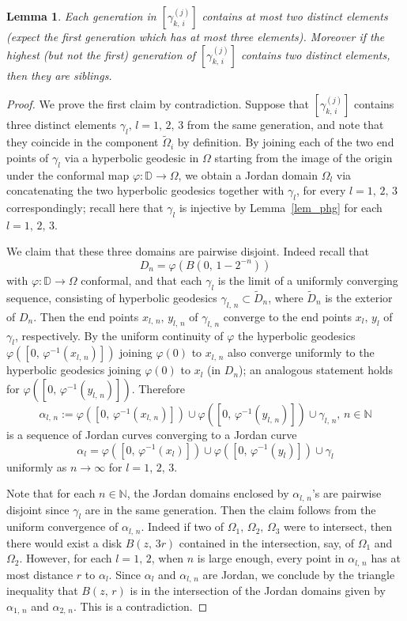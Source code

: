 \documentclass[reqno,11pt]{amsart}
\makeatletter
\def\az{\alpha}
\def\wz{\widetilde}
\newtheorem{lem}[thm]{Lemma}%
\numberwithin{equation}{section}
\theoremstyle{remark}
\makeatother
\begin{document}
\begin{lem}\label{finite overlaps}
Each generation in
$[\gamma_{k,\,i}^{(j)}]$
contains at most two distinct elements (expect the first generation which has at most three elements). Moreover if the highest (but not the first) generation of $[\gamma_{k,\,i}^{(j)}]$
contains  two distinct elements, then they are siblings. 
\end{lem}
\begin{proof}
We prove the first claim by contradiction. Suppose that $[\gamma_{k,\,i}^{(j)}]$
contains three distinct elements $\gamma_l,\,l=1,\,2,\,3$ from the same generation, and note that they coincide in the  component $\wz \Omega_i$ by definition. 
By joining each of the two end points of $\gamma_l$ via a hyperbolic geodesic  in $\Omega$ starting from the image of the origin under the conformal map $\varphi\colon \mathbb D \to \Omega$, we obtain a Jordan domain $\Omega_l$ via concatenating the two hyperbolic geodesics together with $\gamma_l$, for every $l=1,\,2,\,3$ correspondingly; recall here that $\gamma_l$ is injective by Lemma~\ref{lem_phg} for each $l=1,\,2,\,3$. 

We claim that these three domains are pairwise disjoint. Indeed recall that 
$$D_n=\varphi(B(0,\,1-2^{-n}))$$
 with $\varphi\colon \mathbb D \to \Omega$ conformal, and that each $\gamma_l$ is the limit of a uniformly converging sequence, consisting of  hyperbolic geodesics $\gamma_{l,\,n} \subset \wz D_n$, where $\wz D_n$ is the exterior of $D_n$. Then the end points $x_{l,\,n},\,y_{l,\,n}$ of $\gamma_{l,\,n}$ converge to the end points $x_l,\,y_l$ of $\gamma_l$, respectively. By the uniform continuity of $\varphi$ the hyperbolic geodesics $\varphi([0,\,\varphi^{-1}(x_{l,\,n})])$ joining $\varphi(0)$ to $x_{l,\,n}$ also converge uniformly to the hyperbolic geodesics joining $\varphi(0)$ to $x_l$ (in $D_n$); an analogous statement holds for $\varphi([0,\,\varphi^{-1}(y_{l,\,n})])$. Therefore $$\az_{l,\,n}:=\varphi([0,\,\varphi^{-1}(x_{l,\,n})])\cup \varphi([0,\,\varphi^{-1}(y_{l,\,n})])\cup \gamma_{l,\,n},\,n\in \mathbb N$$ is a sequence of Jordan curves converging to a Jordan curve 
 $$\az_l=\varphi([0,\,\varphi^{-1}(x_{l})])\cup \varphi([0,\,\varphi^{-1}(y_{l})])\cup \gamma_{l}$$
uniformly as $n\to \infty$ for $l=1,\,2,\,3$. 


Note that for each $n\in \mathbb N$, the Jordan domains enclosed by $\az_{l,\,n}$'s are pairwise disjoint since $\gamma_l$ are in the same generation. Then the claim follows from the uniform convergence of $\az_{l,\,n}$. Indeed if two of $\Omega_1,\,\Omega_2,\,\Omega_3$ were to intersect, then there would exist a disk $B(z,\,3r)$ contained in the intersection, say, of $\Omega_1$ and $\Omega_2$. However, for each $l=1,\,2$, when $n$ is large enough,  every point in $\az_{l,\,n}$  has at most distance $r$ to $\az_l$. Since $\az_l$ and $\az_{l,\,n}$ are Jordan, we conclude by the triangle inequality that $B(z,\,r)$ is in the intersection of the Jordan domains given by $\az_{1,\,n}$ and $\az_{2,\,n}$. This is a contradiction. 


\end{proof}
\end{document}
